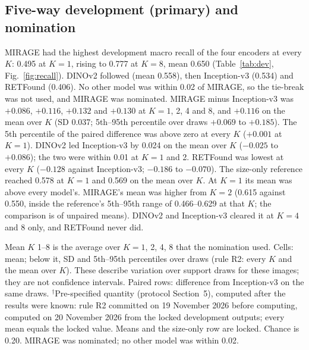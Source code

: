 \documentclass[conference]{IEEEtran}
\begin{document}
\subsection{Five-way development (primary) and nomination}
MIRAGE had the highest development macro recall of the four encoders at every $K$: 0.495 at $K=1$, rising to 0.777 at $K=8$, mean 0.650 (Table~\ref{tab:dev}, Fig.~\ref{fig:recall}). DINOv2 followed (mean 0.558), then Inception-v3 (0.534) and RETFound (0.406). No other model was within 0.02 of MIRAGE, so the tie-break was not used, and MIRAGE was nominated.
MIRAGE minus Inception-v3 was $+0.086$, $+0.116$, $+0.132$ and $+0.130$ at $K=1$, 2, 4 and 8, and $+0.116$ on the mean over $K$ (SD 0.037; 5th--95th percentile over draws $+0.069$ to $+0.185$). The 5th percentile of the paired difference was above zero at every $K$ ($+0.001$ at $K=1$).
DINOv2 led Inception-v3 by 0.024 on the mean over $K$ ($-0.025$ to $+0.086$); the two were within 0.01 at $K=1$ and 2. RETFound was lowest at every $K$ ($-0.128$ against Inception-v3; $-0.186$ to $-0.070$).
The size-only reference reached 0.578 at $K=1$ and 0.569 on the mean over $K$. At $K=1$ its mean was above every model's. MIRAGE's mean was higher from $K=2$ (0.615 against 0.550, inside the reference's 5th--95th range of 0.466--0.629 at that $K$; the comparison is of unpaired means). DINOv2 and Inception-v3 cleared it at $K=4$ and 8 only, and RETFound never did.

\begin{table}[t]
\caption{Development five-way macro recall (primary): 124 queries, five folds pooled; mean over 100 support draws per $K$, every arm on the same supports and queries.}
\label{tab:dev}
\centering\footnotesize
\resizebox{\textwidth}{!}{}
\par\smallskip
\parbox{\textwidth}{\footnotesize Mean $K$ 1--8 is the average over $K=1$, 2, 4, 8 that the nomination used. Cells: mean; below it, SD and 5th--95th percentiles over draws (rule R2: every $K$ and the mean over $K$). These describe variation over support draws for these images; they are not confidence intervals. Paired rows: difference from Inception-v3 on the same draws. $^\dagger$Pre-specified quantity (protocol Section~5), computed after the results were known: rule R2 committed on 19 November 2026 before computing, computed on 20 November 2026 from the locked development outputs; every mean equals the locked value. Means and the size-only row are locked. Chance is 0.20. MIRAGE was nominated; no other model was within 0.02.}
\end{table}
\end{document}

